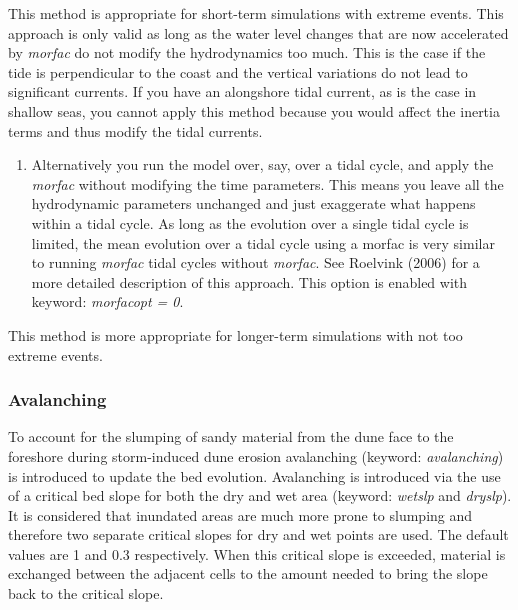 \documentclass{article}
\begin{document}
\noindent 

\noindent This method is appropriate for short-term simulations with extreme events. This approach is only valid as long as the water level changes that are now accelerated by \textit{morfac} do not modify the hydrodynamics too much. This is the case if the tide is perpendicular to the coast and the vertical variations do not lead to significant currents. If you have an alongshore tidal current, as is the case in shallow seas, you cannot apply this method because you would affect the inertia terms and thus modify the tidal currents.

\noindent 

\begin{enumerate}
\item  Alternatively you run the model over, say, over a tidal cycle, and apply the \textit{morfac} without modifying the time parameters. This means you leave all the hydrodynamic parameters unchanged and just exaggerate what happens within a tidal cycle. As long as the evolution over a single tidal cycle is limited, the mean evolution over a tidal cycle using a morfac is very similar to running \textit{morfac} tidal cycles without \textit{morfac}. See Roelvink (2006) for a more detailed description of this approach. This option is enabled with keyword:\textit{ morfacopt = 0}. 
\end{enumerate}

\noindent 

\noindent This method is more appropriate for longer-term simulations with not too extreme events.


\subsubsection{ Avalanching}

\noindent To account for the slumping of sandy material from the dune face to the foreshore during storm-induced dune erosion avalanching (keyword: \textit{avalanching}) is introduced to update the bed evolution. Avalanching is introduced via the use of a critical bed slope for both the dry and wet area (keyword: \textit{wetslp} and \textit{dryslp}). It is considered that inundated areas are much more prone to slumping and therefore two separate critical slopes for dry and wet points are used. The default values are 1 and 0.3 respectively. When this critical slope is exceeded, material is exchanged between the adjacent cells to the amount needed to bring the slope back to the critical slope. 
\end{document}
